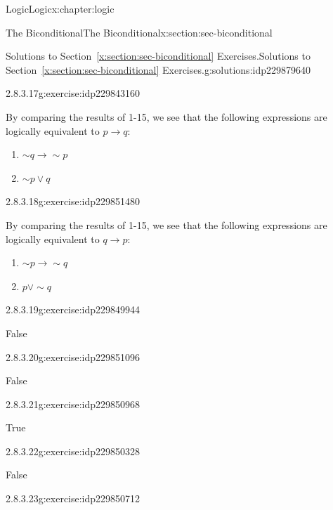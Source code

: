 \documentclass[twoside,10pt,]{book}
\newcommand{\xreffont}{\relax}
\numberwithin{equation}{section}
\newcommand{\conditional}{{p {\rightarrow} q}}
\newcommand{\inverse}{{\sim\!{p}{} {\rightarrow} \sim\!{q}{}}}
\newcommand{\converse}{{q {\rightarrow} p}}
\newcommand{\contrapositive}{{\sim\!{q}{} {\rightarrow} \sim\!{p}{}}}
\begin{document}
\begin{chapterptx}{Logic}{}{Logic}{}{}{x:chapter:logic}
\begin{sectionptx}{The Biconditional}{}{The Biconditional}{}{}{x:section:sec-biconditional}
\begin{solutions-subsection}{Solutions to Section~{\xreffont\ref*{x:section:sec-biconditional}} Exercises.}{}{Solutions to Section~{\xreffont\ref*{x:section:sec-biconditional}} Exercises.}{}{}{g:solutions:idp229879640}
\begin{divisionsolution}{2.8.3.17}{}{g:exercise:idp229843160}
\par\smallskip%
\noindent\hypertarget{g:solution:idp229844568-main}{}By comparing the results of 1-15, we see that the following expressions are logically equivalent to \(\conditional\): %
\begin{enumerate}[label=(\alph*)]
\item{}\(\displaystyle \contrapositive\)%
\item{}\(\displaystyle \sim\!{p}{\vee} q\)%
\end{enumerate}
\end{divisionsolution}%
\begin{divisionsolution}{2.8.3.18}{}{g:exercise:idp229851480}%
\par\smallskip%
\noindent\hypertarget{g:solution:idp229855064-main}{}By comparing the results of 1-15, we see that the following expressions are logically equivalent to \(\converse\): %
\begin{enumerate}[label=(\alph*)]
\item{}\(\displaystyle \inverse\)%
\item{}\(\displaystyle p{\vee}\sim\!{q}\)%
\end{enumerate}
\end{divisionsolution}%
\begin{exercisegroup}
\begin{divisionsolutioneg}{2.8.3.19}{}{g:exercise:idp229849944}%
\par\smallskip%
\noindent\hypertarget{g:solution:idp229857496-main}{}False\end{divisionsolutioneg}%
\begin{divisionsolutioneg}{2.8.3.20}{}{g:exercise:idp229851096}%
\par\smallskip%
\noindent\hypertarget{g:solution:idp229852504-main}{}False\end{divisionsolutioneg}%
\begin{divisionsolutioneg}{2.8.3.21}{}{g:exercise:idp229850968}%
\par\smallskip%
\noindent\hypertarget{g:solution:idp229849816-main}{}True\end{divisionsolutioneg}%
\begin{divisionsolutioneg}{2.8.3.22}{}{g:exercise:idp229850328}%
\par\smallskip%
\noindent\hypertarget{g:solution:idp229853272-main}{}False\end{divisionsolutioneg}%
\begin{divisionsolutioneg}{2.8.3.23}{}{g:exercise:idp229850712}%
\par\smallskip%

\end{divisionsolutioneg}
\end{exercisegroup}
\end{solutions-subsection}
\end{sectionptx}
\end{chapterptx}
\end{document}
